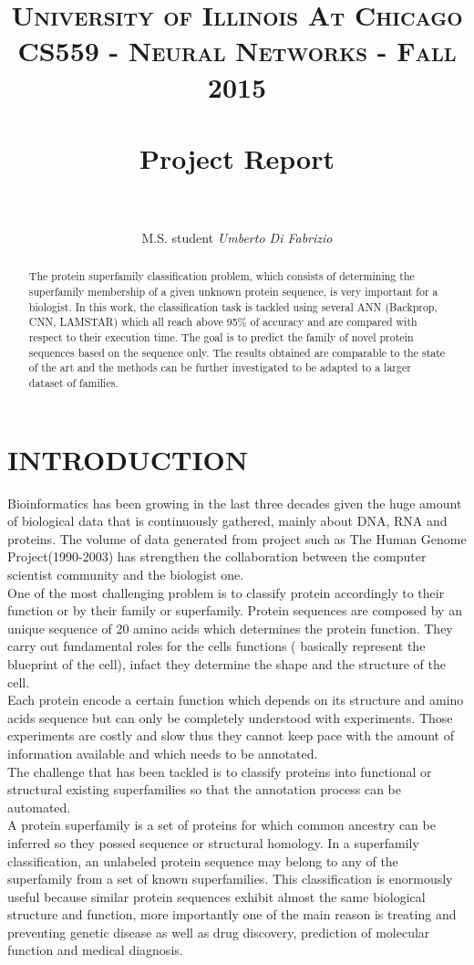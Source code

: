 \documentclass[a4paper, 10pt, conference]{ieeeconf}      %
\title{
		\usefont{OT1}{bch}{b}{n}
		\normalfont \normalsize \textsc{University of Illinois At Chicago\\CS559 - Neural Networks - Fall 2015} \\ [25pt]
		\horrule{2pt} \\[0.4cm]
		\huge Project Report \\
		\horrule{2pt} \\[0.3cm]
}
\author{
		\normalfont 								\large
        M.S. student \textit{Umberto Di Fabrizio}\\		\normalsize
}
\date{}
\begin{document}
\maketitle
\thispagestyle{empty}
\pagestyle{empty}


\begin{abstract}
The protein superfamily classification problem, which consists of determining the superfamily membership
of a given unknown protein sequence, is very important for a biologist. In this work, the classification task is tackled using several ANN (Backprop, CNN, LAMSTAR) which all reach above 95\% of accuracy and are compared with respect to their execution time. The goal
is to predict the family of novel protein sequences based on the sequence only. The results obtained are comparable to the state of the art and the methods can be further investigated to be adapted to a larger dataset of families.
\end{abstract}
\section{INTRODUCTION}
Bioinformatics has been growing in the last three decades\cite{Efficient} given the huge amount of biological data that is continuously gathered, mainly about DNA, RNA and proteins. The volume of data generated from project such as The Human Genome Project\cite{human}(1990-2003) has strengthen the collaboration between the computer scientist community and the biologist one.\\
One of the most challenging problem is to classify protein accordingly to their function or by their family or superfamily. Protein sequences are composed by an unique sequence of 20 amino acids which determines the protein function. They carry out fundamental roles for the cells functions ( basically represent the blueprint of the cell), infact they determine the shape and the structure of the cell.\\ Each protein encode a certain function which depends on its structure and amino acids sequence but can only be completely understood with experiments. Those experiments are costly and slow thus they cannot keep pace with the amount of information available and which needs to be annotated.\\
The challenge that has been tackled is to classify proteins into functional or structural existing superfamilies so that the annotation process can be automated. \\  
A protein superfamily is a set of proteins for which common ancestry can be inferred so they possed sequence or structural homology. 
In a superfamily classification, an unlabeled protein sequence may belong
to any of the superfamily from a set of known superfamilies. This classification is enormously useful because similar protein sequences exhibit almost the same biological structure and function, more importantly one of the main reason is treating and preventing genetic disease as well as drug discovery, prediction of molecular function and medical diagnosis.
\end{document}
